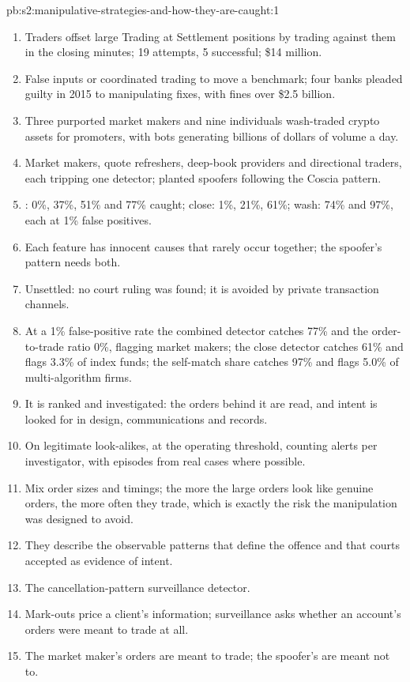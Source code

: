 \begin{solution}{pb:s2:manipulative-strategies-and-how-they-are-caught:1}
\begin{enumerate}
\item Traders offset large Trading at Settlement positions by trading against them in the closing minutes; 19 attempts, 5 successful; \$14 million.
\item False inputs or coordinated trading to move a benchmark; four banks pleaded guilty in 2015 to manipulating fixes, with fines over \$2.5 billion.
\item Three purported market makers and nine individuals wash-traded crypto assets for promoters, with bots generating billions of dollars of volume a
day.
\item Market makers, quote refreshers, deep-book providers and directional traders, each tripping one detector; planted spoofers following the
Coscia pattern.
\item {}: 0\%, 37\%, 51\% and 77\% caught; close: 1\%, 21\%, 61\%; wash: 74\% and 97\%, each at 1\% false positives.
\item Each feature has innocent causes that rarely occur together; the spoofer's pattern needs both.
\item Unsettled: no court ruling was found; it is avoided by private transaction channels.
\item At a 1\% false-positive rate the combined  detector catches 77\% and the order-to-trade ratio 0\%, flagging market makers; the close
detector catches 61\% and flags 3.3\% of index funds; the self-match share catches 97\% and flags 5.0\% of multi-algorithm firms.
\item It is ranked and investigated: the orders behind it are read, and intent is looked for in design, communications and records.
\item On legitimate look-alikes, at the operating threshold, counting alerts per investigator, with episodes from real cases where possible.
\item Mix order sizes and timings; the more the large orders look like genuine orders, the more often they trade, which is exactly the risk the
manipulation was designed to avoid.
\item They describe the observable patterns that define the offence and that courts accepted as evidence of intent.
\item The cancellation-pattern surveillance detector.
\item Mark-outs price a client's information; surveillance asks whether an account's orders were meant to trade at all.
\item The market maker's orders are meant to trade; the spoofer's are meant not to.
\end{enumerate}
\end{solution}

